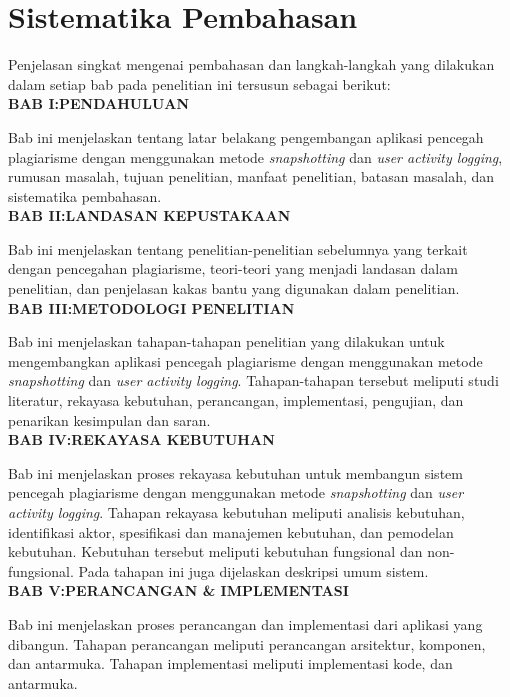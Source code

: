 \section{Sistematika Pembahasan}

Penjelasan singkat mengenai pembahasan dan langkah-langkah yang
dilakukan dalam setiap bab pada penelitian ini tersusun sebagai
berikut:\\

\noindent
\textbf{BAB I:\@ PENDAHULUAN}

Bab ini menjelaskan tentang latar belakang pengembangan aplikasi
pencegah plagiarisme dengan menggunakan metode \emph{snapshotting} dan
\emph{user activity logging}, rumusan masalah,
tujuan penelitian, manfaat penelitian, batasan masalah, dan
sistematika pembahasan.\\

\noindent
\textbf{BAB II:\@ LANDASAN KEPUSTAKAAN}

Bab ini menjelaskan tentang penelitian-penelitian sebelumnya yang
terkait dengan pencegahan plagiarisme, teori-teori yang menjadi
landasan dalam penelitian, dan penjelasan
kakas bantu yang digunakan dalam penelitian.\\
\newpage %
\noindent
\textbf{BAB III:\@ METODOLOGI PENELITIAN}

Bab ini menjelaskan tahapan-tahapan penelitian yang dilakukan untuk
mengembangkan aplikasi pencegah plagiarisme dengan menggunakan metode
\emph{snapshotting} dan \emph{user activity logging}. Tahapan-tahapan
tersebut meliputi studi literatur, rekayasa kebutuhan,
perancangan, implementasi, pengujian, dan penarikan kesimpulan dan
saran.\\

\noindent
\textbf{BAB IV:\@ REKAYASA KEBUTUHAN}

Bab ini menjelaskan proses rekayasa kebutuhan untuk membangun
sistem pencegah plagiarisme dengan menggunakan metode
\emph{snapshotting} dan \emph{user activity logging}. Tahapan
rekayasa kebutuhan meliputi analisis kebutuhan, identifikasi
aktor, spesifikasi dan manajemen kebutuhan, dan pemodelan
kebutuhan. Kebutuhan tersebut meliputi kebutuhan fungsional dan
non-fungsional. Pada tahapan ini juga dijelaskan deskripsi umum sistem. \\

\noindent
\textbf{BAB V:\@ PERANCANGAN \& IMPLEMENTASI}

Bab ini menjelaskan proses perancangan dan implementasi dari
aplikasi yang dibangun. Tahapan perancangan meliputi perancangan
arsitektur, komponen, dan antarmuka. Tahapan implementasi meliputi
implementasi kode, dan antarmuka.\\

